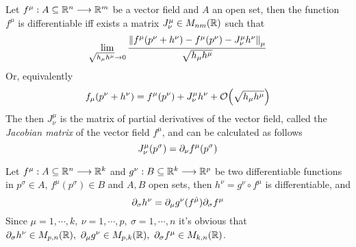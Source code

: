 \documentclass[../complete.tex]{subfiles}
\begin{document}
\begin{thm}
	Let $f^\mu:A\subseteq\mathbb{R}^n\overset{}{\longrightarrow}\mathbb{R}^m$ be a vector field and $A$ an open set, then the function $f^\mu$ is differentiable iff exists a matrix $J^\mu_\nu\in M_{nm}(\mathbb{R})$ such that
	\begin{equation}
		\lim_{\sqrt{h_\mu h^\mu}\to0}\frac{\norm{f^\mu(p^\nu+h^\nu)-f^\mu(p^\nu)-J^\mu_\nu h^\nu}_{\mu}}{\sqrt{h_\mu h^\mu}}
		\label{eq:jacmatrix}
	\end{equation}
	Or, equivalently
	\begin{equation}
		f_\mu(p^\nu+h^\nu)=f^\mu(p^\nu)+J^\mu_\nu h^\nu+\order{\sqrt{h_\mu h^\mu}}
		\label{eq:diffvf}
	\end{equation}
	The then $J^\mu_\nu$ is the matrix of partial derivatives of the vector field, called the \textit{Jacobian matrix} of the vector field $f^\mu$, and can be calculated as follows
	\begin{equation}
		J^\mu_\nu(p^\sigma)=\partial_\nu f^\mu(p^\sigma)
		\label{eq:jacobian}
	\end{equation}
\end{thm}
\begin{thm}
	Let $f^\mu:A\subseteq\mathbb{R}^n\overset{}{\longrightarrow}\mathbb{R}^k$ and $g^\nu:B\subseteq\mathbb{R}^k\overset{}{\longrightarrow}\mathbb{R}^p$ be two differentiable functions in $p^\sigma\in A$, $f^\mu(p^\sigma)\in B$ and $A,B$ open sets, then $h^\nu=g^\nu\circ f^\mu$ is differentiable, and
	\begin{equation}
		\partial_\sigma h^\nu=\partial_\mu g^\nu(f^{\tilde{\mu}})\partial_\sigma f^\mu
		\label{eq:compdervf}
	\end{equation}%
	Since $\mu=1,\cdots,k,\ \nu=1,\cdots,p,\ \sigma=1,\cdots,n$ it's obvious that $\partial_\sigma h^\nu\in M_{p,n}(\mathbb{R}),\ \partial_\mu g^\nu\in M_{p,k}(\mathbb{R}),\ \partial_\sigma f^\mu\in M_{k,n}(\mathbb{R})$.
\end{thm}
\end{document}
